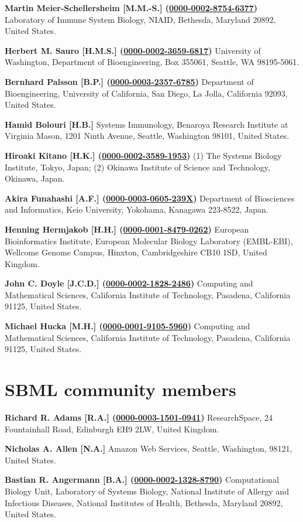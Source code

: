 \documentclass{sbml-paper}
\newcommand{\orcid}[1]{\href{https://orcid.org/#1}{#1}}
\begin{document}
\textbf{Martin Meier-Schellersheim [M.M.-S.] (\orcid{0000-0002-8754-6377})} Laboratory of Immune System Biology, NIAID, Bethesda, Maryland 20892, United States.

\textbf{Herbert M. Sauro [H.M.S.] (\orcid{0000-0002-3659-6817})} University of Washington, Department of Bioengineering, Box 355061, Seattle, WA 98195-5061.

\textbf{Bernhard Palsson [B.P.] (\orcid{0000-0003-2357-6785})} Department of Bioengineering, University of California, San Diego, La Jolla, California 92093, United States.

\textbf{Hamid Bolouri [H.B.]} Systems Immunology, Benaroya Research Institute at Virginia Mason, 1201 Ninth Avenue, Seattle, Washington 98101, United States.

\textbf{Hiroaki Kitano [H.K.] (\orcid{0000-0002-3589-1953})} (1) The Systems Biology Institute, Tokyo, Japan; (2) Okinawa Institute of Science and Technology, Okinawa, Japan.

\textbf{Akira Funahashi [A.F.] (\orcid{0000-0003-0605-239X})} Department of Biosciences and Informatics, Keio University, Yokohama, Kanagawa 223-8522, Japan.

\textbf{Henning Hermjakob [H.H.] (\orcid{0000-0001-8479-0262})} European Bioinformatics Institute, European Molecular Biology Laboratory (EMBL-EBI), Wellcome Genome Campus, Hinxton, Cambridgeshire CB10 1SD, United Kingdom.

\textbf{John C. Doyle [J.C.D.] (\orcid{0000-0002-1828-2486})} Computing and Mathematical Sciences, California Institute of Technology, Pasadena, California 91125, United States.

\textbf{Michael Hucka [M.H.] (\orcid{0000-0001-9105-5960})} Computing and Mathematical Sciences, California Institute of Technology, Pasadena, California 91125, United States.


\clearpage
\section{SBML community members}

\textbf{Richard R. Adams [R.A.] (\orcid{0000-0003-1501-0941})} ResearchSpace, 24 Fountainhall Road, Edinburgh EH9 2LW, United Kingdom.

\textbf{Nicholas A. Allen [N.A.]} Amazon Web Services, Seattle, Washington, 98121, United States.

\textbf{Bastian R. Angermann [B.A.] (\orcid{0000-0002-1328-8790})} Computational Biology Unit, Laboratory of Systems Biology, National Institute of Allergy and Infectious Diseases, National Institutes of Health, Bethesda, Maryland 20892, United States.
\end{document}
